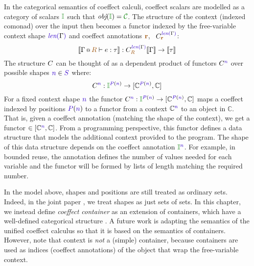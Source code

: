 \noindent
In the categorical semantics of coeffect calculi, coeffect scalars are modelled as a
category of scalars $\cclrd{\mathbb{I}}$ such that $\textit{obj}(\cclrd{\mathbb{I}}) = \C$.
The structure of the context (indexed comonad) over the input then becomes a functor
indexed by the free-variable context shape $\slen{\Gamma}$ and coeffect annotations
$\aclrd{\textbf{r}}$, \ie~$\ctyp{\slen{\Gamma}}_{\aclrd{\textbf{r}}}$:
%
\begin{equation*}
\sem{\coctx{\Gamma}{\aclrd{R}} \vdash e : \tau} : \ctyp{\slen{\Gamma}}_{\aclrd{R}}
\sem{\Gamma} \rightarrow \sem{\tau}
\end{equation*}
%
The structure $\ctyp{}$ can be thought of as a dependent product of functors $\ctyp{\sclrd{n}}$
over possible shapes $\sclrd{n} \in \SH$ where:
%
\begin{equation*}
\ctyp{\sclrd{n}} : \cclrd{\mathbb{I}}^{\SP(\sclrd{n})} \rightarrow [\mathbb{C}^{\SP(\sclrd{n})}, \mathbb{C}]
\end{equation*}
%
For a fixed context shape $\sclrd{n}$ the functor
$\ctyp{\sclrd{n}} : \cclrd{\mathbb{I}}^{\SP(\sclrd{n})} \rightarrow [\mathbb{C}^{\SP(\sclrd{n})}, \mathbb{C}]$
maps a coeffect indexed by positions $\SP(\sclrd{n})$ to a functor from a context
$\mathbb{C}^{\sclrd{n}}$ to an object in $\mathbb{C}$. That is, given a coeffect annotation
(matching the shape of the context), we get a functor $\in [\mathbb{C}^{\sclrd{n}},\mathbb{C}]$.
From a programming perspective, this functor defines a data structure that models the additional
context provided to the program. The shape of this data structure depends on the coeffect
annotation $\cclrd{\mathbb{I}}^{\sclrd{n}}$. For example, in bounded reuse, the annotation defines
the number of values needed for each variable and the functor will be
formed by lists of length matching the required number.

In the model above, shapes and positions are still treated as ordinary sets. Indeed, in the
joint paper \cite{coeffects-icfp14}, we treat shapes as just sets of sets. In this chapter, we
instead define \emph{coeffect container} as an extension of containers, which have a well-defined
categorical structure \cite{semantics-containers}. A future work is adapting the semantics of
the unified coeffect calculus so that it is based on the semantics of containers. However, note
that context is \emph{not} a (simple) container, because containers are used as indices (coeffect
annotations) of the object that wrap the free-variable context.




